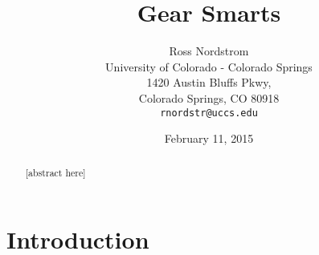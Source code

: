 \documentclass{sig-alternate}
\begin{document}
\title{Gear Smarts}
\author{Ross Nordstrom\\
        University of Colorado - Colorado Springs\\
        1420 Austin Bluffs Pkwy,\\
        Colorado Springs, CO 80918\\
        \texttt{rnordstr@uccs.edu}
       }
\date{February 11, 2015}

\maketitle

\begin{abstract}
   [abstract here]
\end{abstract}



\section{Introduction}








{}

\end{document}
